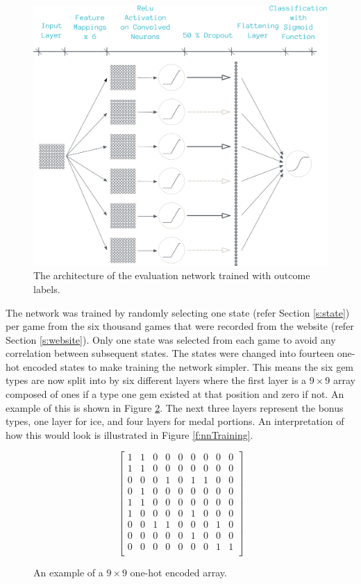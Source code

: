 \documentclass{bhamthesis}
\theoremstyle{definition}
\begin{document}
\begin{figure}
	\includegraphics[width=\textwidth]{media/img/nnArch}
	\caption{The architecture of the evaluation network trained with outcome labels.}\label{f:nnArch}
\end{figure}
 The network was trained by randomly selecting one state (refer Section \ref{s:state}) per game from the six thousand games that were recorded from the website (refer Section \ref{s:website}). Only one state was selected from each game to avoid any correlation between subsequent states. The states were changed into fourteen one-hot encoded states to make training the network simpler. This means the six gem types are now split into by six different layers where the first layer is a $9 \times 9$ array composed of ones if a type one gem existed at that position and zero if not. An example of this is shown in Figure \ref{f:oneHot}. The next three layers represent the bonus types, one layer for ice, and four layers for medal portions. An interpretation of how this would look is illustrated in Figure \ref{f:nnTraining}.
 
\begin{figure}
	 \begin{equation}
 \left[\begin{array}{ccccccccc}
 1 & 1 & 0 & 0& 0& 0& 0& 0& 0\\ 
 1 & 1 & 0 & 0& 0& 0& 0& 0& 0\\ 
 0 & 0 & 0 & 1& 0& 1& 1& 0& 0\\ 
 0 & 1 & 0 & 0& 0& 0& 0& 0& 0\\ 
 1 & 1 & 0 & 0& 0& 0& 0& 0& 0\\ 
 1 & 0 & 0 & 0& 0&1& 0& 0& 0\\ 
 0 & 0 & 1 & 1& 0& 0& 0&1& 0\\ 
 0 & 0 & 0 & 0& 0& 1& 0& 0& 0\\ 
 0 & 0 & 0 & 0& 0& 0& 0& 1& 1\\ 
 \end{array}\right]
 \end{equation}
	\caption{An example of a $9 \times 9$ one-hot encoded array.}
	\label{f:oneHot}
\end{figure}
 
\end{document}
